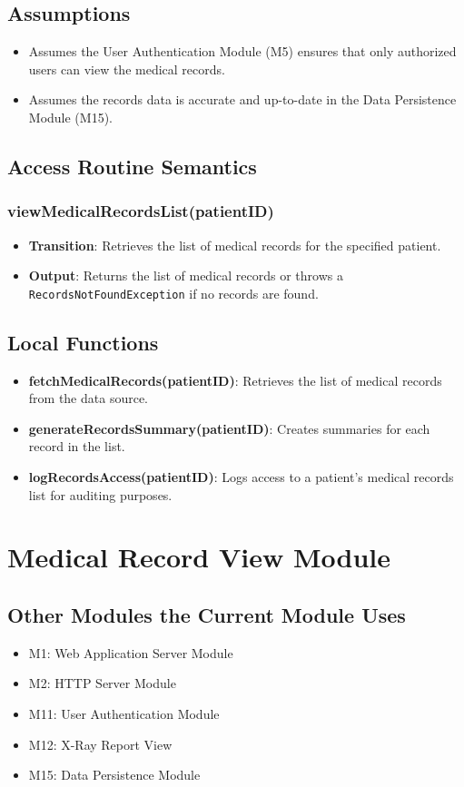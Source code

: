 \documentclass[12pt, titlepage]{article}
\begin{document}
\subsection{Assumptions}
\begin{itemize}
\item Assumes the User Authentication Module (M5) ensures that only authorized users can view the medical records.
\item Assumes the records data is accurate and up-to-date in the Data Persistence Module (M15).
\end{itemize}

\subsection{Access Routine Semantics}
\subsubsection{viewMedicalRecordsList(patientID)}
\begin{itemize}
    \item \textbf{Transition}: Retrieves the list of medical records for the specified patient.
    \item \textbf{Output}: Returns the list of medical records or throws a \texttt{RecordsNotFoundException} if no records are found.
\end{itemize}

\subsection{Local Functions}
\begin{itemize}
\item \textbf{fetchMedicalRecords(patientID)}: Retrieves the list of medical records from the data source.
\item \textbf{generateRecordsSummary(patientID)}: Creates summaries for each record in the list.
\item \textbf{logRecordsAccess(patientID)}: Logs access to a patient's medical records list for auditing purposes.
\end{itemize}
\section{Medical Record View Module}

\subsection{Other Modules the Current Module Uses}
\begin{itemize}
\item M1: Web Application Server Module
\item M2: HTTP Server Module
\item M11: User Authentication Module
\item M12: X-Ray Report View
\item M15: Data Persistence Module
\end{itemize}
\end{document}
